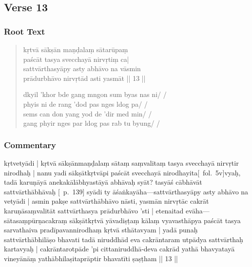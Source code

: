 \documentclass[12pt]{article}
\newcommand{\emdash} {\hspace{0em}—\hspace{0em}}
\begin{document}
\subsection{Verse 13}
\subsubsection{Root Text}
\begin{quote}
	kṛtvā sākṣān maṇḍalaṃ sātarūpaṃ \\
	paścāt tasya svecchayā nirvṛtiṃ\footnoteB{
		nirvṛtiṃ] \EDD ; nirvṛtiś \MS
	} ca|\\
	sattvārthasyāpy asty abhāvo na vāsmin \\
	prādurbhāvo nirvṛtād\footnoteB{
		nirvṛtād] \EDD ; nivṛtād \MS
	} asti yasmāt || 13 ||

	dkyil 'khor bde gang mngon sum byas nas ni/ /\\
	phyis ni de rang 'dod pas nges ldog pa/ /\\
	sems can don yang yod de 'dir med min/ /\\
	gang phyir nges par ldog pas rab tu byung/ /
\end{quote}

\subsubsection{Commentary}
kṛtvetyādi | kṛtvā sākṣānmaṇḍalaṃ sātaṃ saṃvalitaṃ tasya svecchayā nirvṛtir nirodhaḥ | nanu yadi sākṣātkṛtvāpi paścāt svecchayā nirodhayita[\MS\ fol.\ 5v]vyaḥ, tadā karuṇāyā anekakālābhyastāyā abhāvaḥ syāt? tasyāś cābhāvāt sattvārthābhāvaḥ [\EDD\ p.\ 139] syādi ty āśaṅkayāha\emdash sattvārthasyāpy asty abhāvo na vetyādi | asmin pakṣe sattvārthābhāvo nāsti, yasmān nirvṛtāc cakrāt karuṇāsaṃvalitāt sattvārthasya prādurbhāvo 'sti | etenaitad evāha\emdash sātasaṃpūrṇacakraṃ sākṣātkṛtvā yāvadiṣṭaṃ kālaṃ vyavasthāpya paścāt tasya sarvathaiva pradīpavannirodhaṃ kṛtvā sthātavyam | yadā punaḥ sattvārthābhilāṣo bhavati tadā niruddhād eva cakrāntaram utpādya sattvārthaḥ kartavyaḥ | cakrāntarotpāde 'pi cittaniruddhā-deva cakrād yathā bhavyatayā vineyānāṃ yathābhilaṣitaprāptir bhavatīti ṣaṣṭham || 13 ||\\
\end{document}
